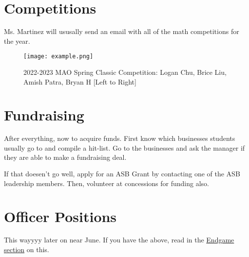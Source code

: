 \section{Competitions}
    Ms. Martinez will ususally send an email with all of the math competitions for the year. 

    \begin{figure}[H]
        \centering
        \texttt{[image: example.png]}
        \caption{2022-2023 MAO Spring Classic Competition: Logan Chu, Brice Liu, Amish Patra, Bryan H [Left to Right]}
        \label{fig:old competition image example}
    \end{figure}

\section{Fundraising}
After everything, now to acquire funds.
First know which businesses students usually go to and compile a hit-list.
Go to the businesses and ask the manager if they are able to make a fundraising deal.

If that doesen't go well, apply for an ASB Grant by contacting one of the ASB leadership members.
Then, volunteer at concessions for funding also.

\section{Officer Positions}
This wayyyy later on near June. If you have  the above,
read in the \hyperref[sec:Officer]{ Endgame section} on this. 